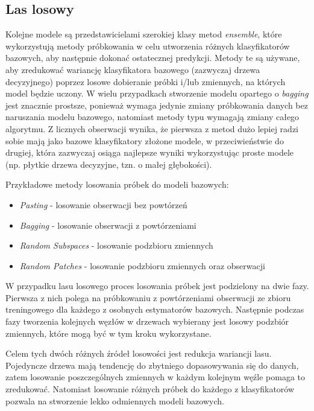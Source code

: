 \documentclass[openany]{book}
\begin{document}
\subsection{Las losowy}
	Kolejne modele są przedstawicielami szerokiej klasy metod \textit{ensemble}, które wykorzystują metody próbkowania w celu utworzenia różnych klasyfikatorów bazowych, aby następnie dokonać ostatecznej predykcji. Metody te są używane, aby zredukować wariancję klasyfikatora bazowego (zazwyczaj drzewa decyzyjnego) poprzez losowe dobieranie próbki i/lub zmiennych, na których model będzie uczony. W wielu przypadkach stworzenie modelu opartego o \textit{bagging} jest znacznie prostsze, ponieważ wymaga jedynie zmiany próbkowania danych bez naruszania modelu bazowego, natomiast metody typu  wymagają zmiany całego algorytmu. Z licznych obserwacji wynika, że pierwsza z metod dużo lepiej radzi sobie mają jako bazowe klasyfikatory złożone modele, w przeciwieństwie do drugiej, która zazwyczaj osiąga najlepsze wyniki wykorzystując proste modele (np. płytkie drzewa decyzyjne, tzn. o małej głębokości).
	
	Przykładowe metody losowania próbek do modeli bazowych:
	\begin{itemize}
		\item \textit{Pasting} - losowanie obserwacji bez powtórzeń
		\item \textit{Bagging} - losowanie obserwacji z powtórzeniami
		\item \textit{Random Subspaces} - losowanie podzbioru zmiennych
		\item \textit{Random Patches} - losowanie podzbioru zmiennych oraz obserwacji 
	\end{itemize}
	
	W przypadku lasu losowego proces losowania próbek jest podzielony na dwie fazy. Pierwsza z nich polega na próbkowaniu z powtórzeniami obserwacji ze zbioru treningowego dla każdego z osobnych estymatorów bazowych. Następnie podczas fazy tworzenia kolejnych węzłów w drzewach wybierany jest losowy podzbiór zmiennych, które mogą być w tym kroku wykorzystane. 
	
	Celem tych dwóch różnych źródeł losowości jest redukcja wariancji lasu. Pojedyncze drzewa mają tendencję do zbytniego dopasowywania się do danych, zatem losowanie poszczególnych zmiennych w każdym kolejnym węźle pomaga to zredukować. Natomiast losowanie różnych próbek do każdego z klasyfikatorów pozwala na stworzenie lekko odmiennych modeli bazowych.
\end{document}
